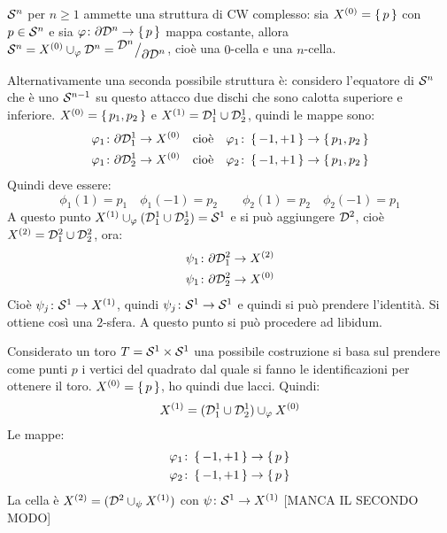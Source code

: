 \begin{example}[Sfere]
  $ \mathcal{S}^{n} $ per $ n \geq 1 $ ammette una struttura di CW complesso: sia $ X^{(0)} = \set{p} $ con
  $ p \in \mathcal{S}^{n} $ e sia $ \varphi \colon \partial \mathcal{D}^{n} \to \set{p} $ mappa costante, allora
  $ \mathcal{S}^{n} = X^{(0)} \cup_\varphi \mathcal{D}^{n} = {^{\textstyle \mathcal{D}^{n}}\big/_{\textstyle \partial \mathcal{D}^{n}}} $, cioè una $ 0 $-cella e una
  $ n $-cella.

  Alternativamente una seconda possibile struttura è: considero l'equatore di $ \mathcal{S}^{n} $ che
  è uno $ \mathcal{S}^{n-1} $ su questo attacco due dischi che sono calotta superiore e inferiore.
  $ X^{(0)} = \set{p_1, p_2} $ e $ X^{(1)} = \mathcal{D}^{1}_1 \cup \mathcal{D}^{1}_2 $, quindi le mappe
  sono:
  \begin{gather*}
    \varphi_1 \colon \partial \mathcal{D}^{1}_1 \to X^{(0)} \quad \text{cioè} \quad \varphi_1 \colon \set{-1, +1} \to \set{p_1, p_2} \\
    \varphi_1 \colon \partial \mathcal{D}^{1}_2 \to X^{(0)} \quad \text{cioè} \quad \varphi_2 \colon \set{-1, +1} \to \set{p_1, p_2}
  \end{gather*}
  Quindi deve essere:
  \[
    \phi_1(1) = p_1 \quad \phi_1(-1) = p_2 \qquad  \phi_2(1) = p_2 \quad \phi_2(-1) = p_1
  \]
  A questo punto $ X^{(1)} \cup_\varphi (\mathcal{D}^{1}_1 \cup \mathcal{D}^{1}_2) = \mathcal{S}^{1} $ e si può aggiungere
  $ \mathcal{D}^{2} $, cioè $ X^{(2)} = \mathcal{D}^{2}_1 \cup \mathcal{D}^{2}_2 $, ora:
  \begin{gather*}
    \psi_1 \colon \partial \mathcal{D}^{2}_1 \to X^{(2)} \\
    \psi_1 \colon \partial \mathcal{D}^{2}_2 \to X^{(0)}
  \end{gather*}
  Cioè $ \psi_j \colon \mathcal{S}^{1} \to X^{(1)} $, quindi $ \psi_j \colon \mathcal{S}^{1} \to \mathcal{S}^{1} $ e quindi si può prendere
  l'identità. Si ottiene così una $ 2 $-sfera. A questo punto si può procedere ad libidum.
\end{example}

\begin{example}[Toro]
  Considerato un toro $ T = \mathcal{S}^{1} \times \mathcal{S}^{1} $ una possibile costruzione si basa sul prendere
  come punti $ p $ i vertici del quadrato dal quale si fanno le identificazioni per ottenere il
  toro. $ X^{(0)} = \set{p} $, ho quindi due lacci. Quindi:
  \[
    X^{(1)} = (\mathcal{D}^{1}_1 \cup \mathcal{D}^{1}_2) \cup_\varphi X^{(0)}
  \]
  Le mappe:
  \begin{gather*}
    \varphi_1 \colon \set{-1, +1} \to \set{p} \\
    \varphi_2 \colon \set{-1, +1} \to \set{p}
  \end{gather*}
  La cella è $ X^{(2)} = (\mathcal{D}^{2} \cup_\psi X^{(1)}) $ con $ \psi \colon \mathcal{S}^{1} \to X^{(1)} $
  [MANCA IL SECONDO MODO]
\end{example}

